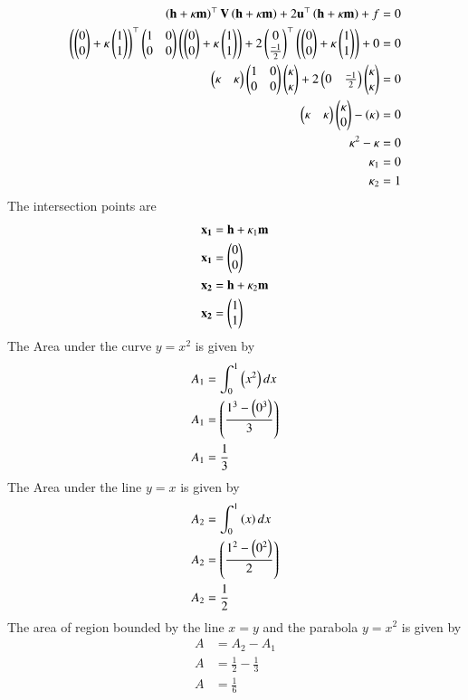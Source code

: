 \documentclass[journal]{IEEEtran}
\begin{document}
\begin{align}
\left(\mathbf{h}+\kappa\mathbf{m}\right)^\top\mathbf{V}\left(\mathbf{h}+\kappa\mathbf{m}\right) + 2\mathbf{u}^\top\left(\mathbf{h}+\kappa\mathbf{m}\right) + f &= 0\\
\left(\begin{pmatrix}0\\0\end{pmatrix}+\kappa\begin{pmatrix}1\\1\end{pmatrix}\right)^\top\begin{pmatrix}1 & 0\\0 & 0\end{pmatrix}\left(\begin{pmatrix}0\\0\end{pmatrix}+\kappa\begin{pmatrix}1\\1\end{pmatrix}\right) + 2\begin{pmatrix}0\\\frac{-1}{2}\end{pmatrix}^\top\left(\begin{pmatrix}0\\0\end{pmatrix}+\kappa\begin{pmatrix}1\\1\end{pmatrix}\right) + 0 &= 0\\
\begin{pmatrix}\kappa&\kappa\end{pmatrix}\begin{pmatrix}1&0\\0&0\end{pmatrix}\begin{pmatrix}\kappa\\\kappa\end{pmatrix}+2\begin{pmatrix}0&\frac{-1}{2}\end{pmatrix}\begin{pmatrix}\kappa\\\kappa\end{pmatrix} &= 0\\
\begin{pmatrix}\kappa&\kappa\end{pmatrix}\begin{pmatrix}\kappa\\0\end{pmatrix}-\left(\kappa\right) &= 0\\
\kappa^2-\kappa &= 0\\
\kappa_1&=0\\
\kappa_2&=1
\end{align}
The intersection points are
\begin{align}
\mathbf{x_1} &= \mathbf{h}+\kappa_1\mathbf{m}\\
\mathbf{x_1} &= \begin{pmatrix}0\\0\end{pmatrix}\\
\mathbf{x_2} &= \mathbf{h}+\kappa_2\mathbf{m}\\
\mathbf{x_2} &= \begin{pmatrix}1\\1\end{pmatrix}
\end{align}
The Area under the curve $y=x^2$ is given by
\begin{align}
A_1 &= \int_{0}^{1}\left(x^2\right)dx\\
A_1 &= \left(\frac{1^3 - \left(0^3\right)}{3}\right)\\
A_1 &= \frac{1}{3}
\end{align}
The Area under the line $y=x$ is given by
\begin{align}
A_2 &= \int_{0}^{1}\left(x\right)dx\\
A_2 &= \left(\frac{1^2 - \left(0^2\right)}{2}\right)\\
A_2 &= \frac{1}{2}
\end{align}
The area of region bounded by the line $x=y$ and the parabola $y=x^2$ is given by
\begin{align}
A &= A_2-A_1\\
A &= \frac{1}{2}-\frac{1}{3}\\
A &= \frac{1}{6}
\end{align}
\end{document}
